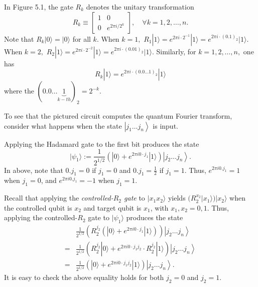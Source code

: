 In Figure 5.1, the gate $R_{k}$ denotes the unitary transformation
\begin{equation}
    R_{k} \equiv\left[\begin{array}{cc}
1 & 0  \tag{5.11}\\
0 & e^{2 \pi i / 2^{k}}
\end{array}\right], \quad \forall k = 1,2,\dots,n.
\end{equation}
Note that $R_{k} |0\rangle = |0\rangle$ for all $k.$ When $k=1,$ $R_{1} |1\rangle = e^{2 \pi i\cdot 2^{-1}}|1\rangle = e^{2 \pi i\cdot (0.1)_2}|1\rangle$. When $k=2,$ $R_{2} |1\rangle = e^{2 \pi i\cdot 2^{-2}}|1\rangle = e^{2 \pi i\cdot (0.01)_2}|1\rangle.$ Similarly, for $k=1,2,\dots,n,$ one has
\begin{equation}
    R_{k} |1\rangle = e^{2 \pi i\cdot (0.0 \dots 1)_2}|1\rangle
\end{equation}
where the $(0.0 \dots \underbrace{1}_{k-th})_2=2^{-k}.$

To see that the pictured circuit computes the quantum Fourier transform, consider what happens when the state $\left|j_{1} \ldots j_{n}\right\rangle$ is input. 

Applying the Hadamard gate to the first bit produces the state
\begin{equation}
    |\psi_1\rangle:=\frac{1}{2^{1 / 2}}\left(|0\rangle+e^{2 \pi i 0 \cdot j_{1}}|1\rangle\right)\left|j_{2} \ldots j_{n}\right\rangle. \tag{5.12}
\end{equation}
In above, note that $0.j_1=0$ if $j_1=0$ and $0.j_1=\frac{1}{2}$ if $j_1=1.$ Thus, $e^{2 \pi i 0 . j_{1}}=1$  when $j_{1}=0$, and $e^{2 \pi i 0 . j_{1}}=-1$ when $j_{1}=1$.

Recall that applying the \textit{controlled-$R_{2}$ gate} to $|x_1 x_2 \rangle$ yields $(R_{2}^{x_2}|x_1\rangle) |x_2 \rangle$ when the controlled qubit is $x_2$ and target qubit is $x_1$, with $x_1,x_2=0,1.$ Thus, applying the controlled-$R_{2}$ gate to $|\psi_1\rangle$ produces the state
\begin{align}
&\frac{1}{2^{1 / 2}} \left( R_{2}^{j_2} \left(|0\rangle+e^{2 \pi i 0 \cdot j_{1}}|1\rangle\right) \right) \left|j_{2} \ldots j_{n}\right\rangle \\
=&\frac{1}{2^{1 / 2}}\left(R_{2}^{j_2} |0\rangle+e^{2 \pi i 0 \cdot j_{1} j_{2}}\cdot R_{2}^{j_2} |1\rangle\right)\left|j_{2} \ldots j_{n}\right\rangle \\
=&\frac{1}{2^{1 / 2}}\left(|0\rangle+e^{2 \pi i 0 \cdot j_{1} j_{2}}|1\rangle\right)\left|j_{2} \ldots j_{n}\right\rangle.     \tag{5.13}
\end{align}
It is easy to check the above equality holds for both $j_2=0$ and $j_2=1.$ 

